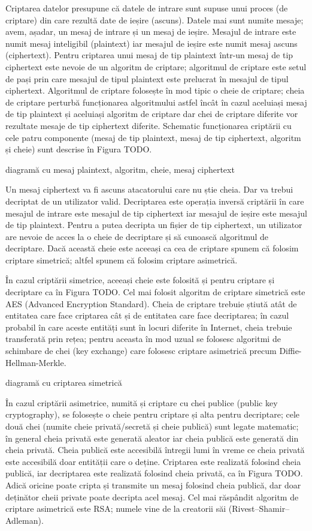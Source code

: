 Criptarea datelor presupune că datele de intrare sunt supuse unui proces (de criptare) din care rezultă date de ieșire (ascuns). Datele mai sunt numite mesaje; avem, așadar, un mesaj de intrare și un mesaj de ieșire. Mesajul de intrare este numit mesaj inteligibil (plaintext) iar mesajul de ieșire este numit mesaj ascuns (ciphertext). Pentru criptarea unui mesaj de tip plaintext într-un mesaj de tip ciphertext este nevoie de un algoritm de criptare; algoritmul de criptare este setul de pași prin care mesajul de tipul plaintext este prelucrat în mesajul de tipul ciphertext. Algoritmul de criptare folosește în mod tipic o cheie de criptare; cheia de criptare perturbă funcționarea algoritmului astfel încât în cazul aceluiași mesaj de tip plaintext și aceluiași algoritm de criptare dar chei de criptare diferite vor rezultate mesaje de tip ciphertext diferite. Schematic funcționarea criptării cu cele patru componente (mesaj de tip plaintext, mesaj de tip ciphertext, algoritm și cheie) sunt descrise în Figura TODO.

diagramă cu mesaj plaintext, algoritm, cheie, mesaj ciphertext

Un mesaj ciphertext va fi ascuns atacatorului care nu știe cheia. Dar va trebui decriptat de un utilizator valid. Decriptarea este operația inversă criptării în care mesajul de intrare este mesajul de tip ciphertext iar mesajul de ieșire este mesajul de tip plaintext. Pentru a putea decripta un fișier de tip ciphertext, un utilizator are nevoie de acces la o cheie de decriptare și să cunoască algoritmul de decriptare. Dacă această cheie este aceeași ca cea de criptare spunem că folosim criptare simetrică; altfel spunem că folosim criptare asimetrică.

În cazul criptării simetrice, aceeași cheie este folosită și pentru criptare și decriptare ca în Figura TODO. Cel mai folosit algoritm de criptare simetrică este AES (Advanced Encryption Standard). Cheia de criptare trebuie știută atât de entitatea care face criptarea cât și de entitatea care face decriptarea; în cazul probabil în care aceste entități sunt în locuri diferite în Internet, cheia trebuie transferată prin rețea; pentru aceasta în mod uzual se folosesc algoritmi de schimbare de chei (key exchange) care folosesc criptare asimetrică precum Diffie-Hellman-Merkle.

diagramă cu criptarea simetrică

În cazul criptării asimetrice, numită și criptare cu chei publice (public key cryptography), se folosește o cheie pentru criptare și alta pentru decriptare; cele două chei (numite cheie privată/secretă și cheie publică) sunt legate matematic; în general cheia privată este generată aleator iar cheia publică este generată din cheia privată. Cheia publică este accesibilă întregii lumi în vreme ce cheia privată este accesibilă doar entității care o deține. Criptarea este realizată folosind cheia publică, iar decriptarea este realizată folosind cheia privată, ca în Figura TODO. Adică oricine poate cripta și transmite un mesaj folosind cheia publică, dar doar deținător cheii private poate decripta acel mesaj. Cel mai răspândit algoritm de criptare asimetrică este RSA; numele vine de la creatorii săi (Rivest–Shamir–Adleman).

